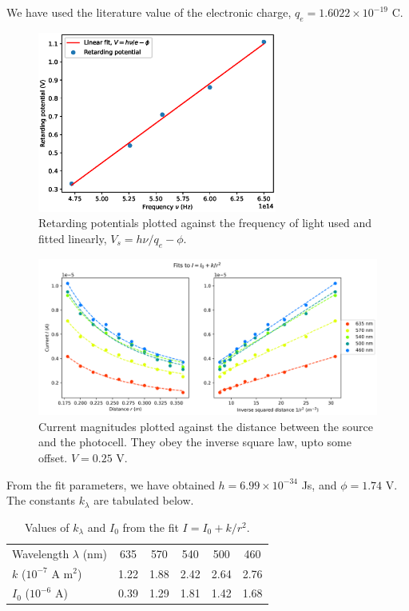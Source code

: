 \documentclass[11pt]{article}
\begin{document}
        We have used the literature value of the electronic charge, $q_e = 1.6022 \times 10^{-19}$ C.
        \begin{figure}[H]
                \centering
                \includegraphics[width=0.7\textwidth]{./planck.eps}
                \caption{Retarding potentials plotted against the frequency of light used and fitted linearly, $V_s = h\nu /q_e - \phi$.}
                \label{fig:planck}
        \end{figure}
        \begin{figure}[H]
                \centering
                \includegraphics[width=1.1\textwidth]{./inverse.png}
                \caption{Current magnitudes plotted against the distance between the source and the photocell. They obey the inverse square law,
                upto some offset. $V = 0.25$ V.}
                \label{fig:inverse}
        \end{figure}
        From the fit parameters, we have obtained $h = 6.99 \times 10^{-34}$ Js, and $\phi = 1.74$ V.
        The constants $k_\lambda$ are tabulated below.
        \begin{table}[H]
        \caption{Values of $k_\lambda$ and $I_0$ from the fit $I = I_0 + k /r^2$.}
        \centering
        \begin{tabular}{l|ccccc}
                Wavelength $\lambda$ (nm) & 635  & 570  & 540  & 500  & 460  \\
                $k$ ($10^{-7}$ A m$^2$)   & 1.22 & 1.88 & 2.42 & 2.64 & 2.76 \\
                $I_0$ ($10^{-6}$ A)       & 0.39 & 1.29 & 1.81 & 1.42 & 1.68
        \end{tabular}
        \label{tab:slopes}
        \end{table}
\end{document}
